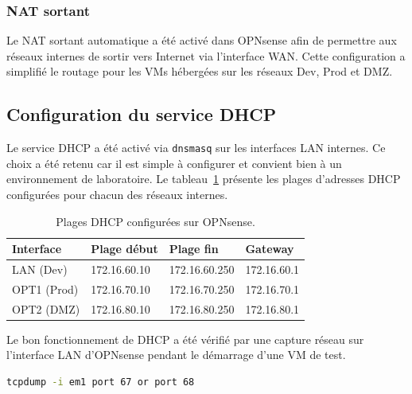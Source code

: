 \subsubsection{NAT sortant}

\par Le NAT sortant automatique a été activé dans OPNsense afin de permettre aux réseaux internes de sortir vers Internet via l'interface WAN. Cette configuration a simplifié le routage pour les VMs hébergées sur les réseaux Dev, Prod et DMZ.\\

\subsection{Configuration du service DHCP}

\par Le service DHCP a été activé via \texttt{dnsmasq} sur les interfaces LAN internes. Ce choix a été retenu car il est simple à configurer et convient bien à un environnement de laboratoire. Le tableau~\ref{tab:dhcp-ranges} présente les plages d'adresses DHCP configurées pour chacun des réseaux internes.\\

\begin{table}[H]
\centering
\caption{Plages DHCP configurées sur OPNsense.}
\label{tab:dhcp-ranges}
\begin{tabular}{|l|l|l|l|}
\hline
\textbf{Interface} & \textbf{Plage début} & \textbf{Plage fin} & \textbf{Gateway} \\
\hline
LAN (Dev) & 172.16.60.10 & 172.16.60.250 & 172.16.60.1 \\
\hline
OPT1 (Prod) & 172.16.70.10 & 172.16.70.250 & 172.16.70.1 \\
\hline
OPT2 (DMZ) & 172.16.80.10 & 172.16.80.250 & 172.16.80.1 \\
\hline
\end{tabular}
\end{table}

\par Le bon fonctionnement de DHCP a été vérifié par une capture réseau sur l'interface LAN d'OPNsense pendant le démarrage d'une VM de test.\\

\begin{lstlisting}[style=sonacode,language=bash,caption={Capture du trafic DHCP avec tcpdump},label={lst:tcpdump-dhcp}]
tcpdump -i em1 port 67 or port 68
\end{lstlisting}

